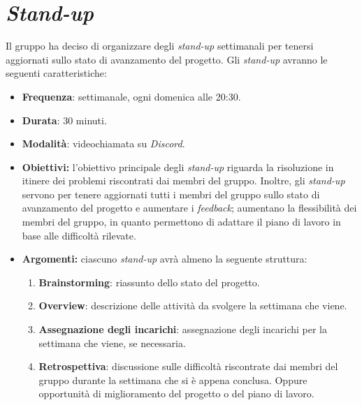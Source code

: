 \section{\textit{Stand-up}}

Il gruppo ha deciso di organizzare degli \textit{stand-up} settimanali per
tenersi aggiornati sullo stato di avanzamento del progetto. Gli \textit{stand-up}
avranno le seguenti caratteristiche:

\begin{itemize}
	\item \textbf{Frequenza}: settimanale, ogni domenica alle 20:30.

	\item \textbf{Durata}: 30 minuti.

	\item \textbf{Modalità}: videochiamata su \textit{Discord}.

	\item \textbf{Obiettivi:} l'obiettivo principale degli \textit{stand-up}
	      riguarda la risoluzione in itinere dei problemi riscontrati dai membri
	      del gruppo. Inoltre, gli \textit{stand-up} servono per tenere
	      aggiornati tutti i membri del gruppo sullo stato di avanzamento del
	      progetto e aumentare i \textit{feedback}; aumentano la flessibilità dei
	      membri del gruppo, in quanto permettono di adattare il piano di lavoro
	      in base alle difficoltà rilevate.

	\item \textbf{Argomenti:} ciascuno \textit{stand-up} avrà almeno la
	      seguente struttura:
	      \begin{enumerate}
		      \item \textbf{Brainstorming}: riassunto dello stato del progetto.

		      \item \textbf{Overview}: descrizione delle attività da svolgere la
		            settimana che viene.

		      \item \textbf{Assegnazione degli incarichi}: assegnazione degli
		            incarichi per la settimana che viene, se necessaria.

		      \item \textbf{Retrospettiva}: discussione sulle difficoltà
		            riscontrate dai membri del gruppo durante la settimana che si
		            è appena conclusa. Oppure opportunità di miglioramento del
		            progetto o del piano di lavoro.
	      \end{enumerate}
\end{itemize}

